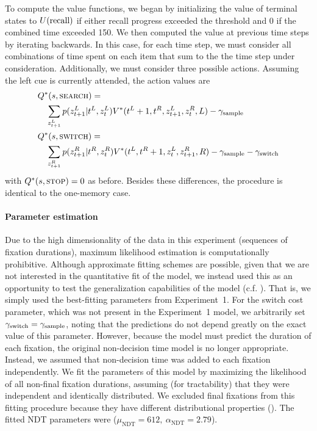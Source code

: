 To compute the value functions, we began by initializing the value of terminal states to $U({\text{recall}})$ if either recall progress exceeded the threshold and 0 if the combined time exceeded 150. We then computed the value at previous time steps by iterating backwards. In this case, for each time step, we must consider all combinations of time spent on each item that sum to the the time step under consideration. Additionally, we must consider three possible actions. Assuming the left cue is currently attended, the action values are
%
\begin{equation}
\begin{aligned}
  &Q^*(s, \textsc{search}) = \\
    &\quad\sum_{z^{L}_{t+1}} p(z^{L}_{t+1} | t^{L}, z^{L}_t) 
    V^*(t^{L}+1, t^{R}, z^{L}_{t+1}, z^{R}_t, L) - \gamma_\text{sample} \\
  &Q^*(s, \textsc{switch}) = \\
    &\quad\sum_{z^{R}_{t+1}} p(z^{R}_{t+1} | t^{R}, z^{R}_t) 
    V^*(t^{L}, t^{R}+1, z^{L}_{t}, z^{R}_{t+1}, R) - \gamma_\text{sample} - \gamma_\text{switch}\\
\end{aligned}
\end{equation}
%
with $Q^*(s, \textsc{stop}) = 0$ as before. Besides these differences, the procedure is identical to the one-memory case.

\paragraph{Parameter estimation}

Due to the high dimensionality of the data in this experiment (sequences of fixation durations), maximum likelihood estimation is computationally prohibitive. Although approximate fitting schemes are possible, given that we are not interested in the quantitative fit of the model, we instead used this as an opportunity to test the generalization capabilities of the model (c.f. \citealp{krajbich2011multialternative}). That is, we simply used the best-fitting parameters from Experiment~1. For the switch cost parameter, which was not present in the Experiment~1 model, we arbitrarily set $\gamma_\text{switch} = \gamma_\text{sample}$, noting that the predictions do not depend greatly on the exact value of this parameter. However, because the model must predict the duration of each fixation, the original non-decision time model is no longer appropriate. Instead, we assumed that non-decision time was added to each fixation independently. We fit the parameters of this model by maximizing the likelihood of all non-final fixation durations, assuming (for tractability) that they were independent and identically distributed. We excluded final fixations from this fitting procedure because they have different distributional properties (). The fitted NDT parameters were (\(
    \mu_\text{NDT} = 612,\ 
    \alpha_\text{NDT} = 2.79
\)).


